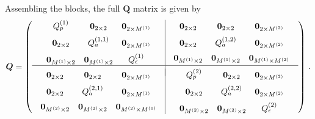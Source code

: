 \documentclass{tufte-handout} %
\begin{document}
	Assembling the blocks, the full \( \boldsymbol{Q} \) matrix is given by
	\begin{equation}
		\boldsymbol{Q} =
		\begin{pmatrix}
			\begin{array}{c|c}
				\begin{array}{ccc}
					Q_p^{(1)} & \boldsymbol{0}_{2\times2} & \boldsymbol{0}_{2\times M^{(1)}}
					\\[2mm]
					\boldsymbol{0}_{2\times2} & Q_a^{(1,1)} & \boldsymbol{0}_{2\times M^{(1)}}
					\\[2mm]
					\boldsymbol{0}_{M^{(1)}\times2} & \boldsymbol{0}_{M^{(1)}\times2} & Q_\epsilon^{(1)}
				\end{array}
				& 
				\begin{array}{ccc}
					\boldsymbol{0}_{2\times2} & \boldsymbol{0}_{2\times2} & \boldsymbol{0}_{2\times M^{(2)}
					}\\[2mm]
					\boldsymbol{0}_{2\times2} & Q_a^{(1,2)} & \boldsymbol{0}_{2\times M^{(2)}
					}\\[2mm]
					\boldsymbol{0}_{M^{(1)}\times2} & \boldsymbol{0}_{M^{(1)}\times2} & \boldsymbol{0}_{M^{(1)}\times M^{(2)}
					}
				\end{array}
				\\[4mm]
				\hline \\[-3mm]
				\begin{array}{ccc}
					\boldsymbol{0}_{2\times2} & \boldsymbol{0}_{2\times2} & \boldsymbol{0}_{2\times M^{(1)}
					}\\[2mm]
					\boldsymbol{0}_{2\times2} & Q_a^{(2,1)} & \boldsymbol{0}_{2\times M^{(1)}
					}\\[2mm]
					\boldsymbol{0}_{M^{(2)}\times2} & \boldsymbol{0}_{M^{(2)}\times2} & \boldsymbol{0}_{M^{(2)}\times M^{(1)}
					}
				\end{array}
				&
				\begin{array}{ccc}
					Q_p^{(2)} & \boldsymbol{0}_{2\times2} & \boldsymbol{0}_{2\times M^{(2)}
					}\\[2mm]
					\boldsymbol{0}_{2\times2} & Q_a^{(2,2)} & \boldsymbol{0}_{2\times M^{(2)}
					}\\[2mm]
					\boldsymbol{0}_{M^{(2)}\times2} & \boldsymbol{0}_{M^{(2)}\times2} & Q_\epsilon^{(2)}
				\end{array}
			\end{array}
		\end{pmatrix}\,.
	\end{equation}
	
\end{document}
